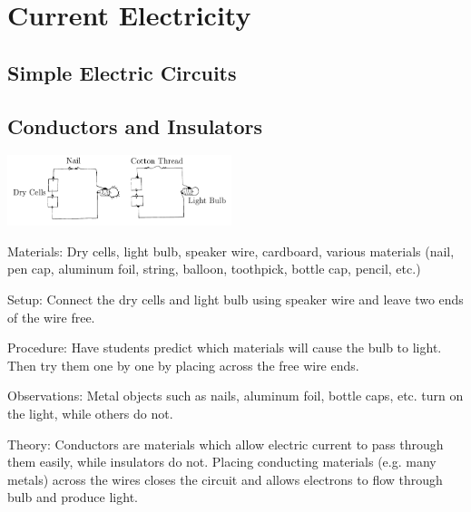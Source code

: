 \section{Current Electricity}
\label{sec:ii-current-electricity}

\begin{multicols}{2}


\section*{Simple Electric Circuits}


\subsection{Conductors and Insulators}

\begin{center}
\includegraphics[width=0.49\textwidth]{./img/conductors-insulators.png}
\end{center}

\begin{description*}
\item[Materials:]{Dry cells, light bulb, speaker wire, cardboard, various materials (nail, pen cap, aluminum foil, string, balloon, toothpick, bottle cap, pencil, etc.)}
\item[Setup:]{Connect the dry cells and light bulb using speaker wire and leave two ends of the wire free.}
\item[Procedure:]{Have students predict which materials will cause the bulb to light. Then try them one by one by placing across the free wire ends.}
\item[Observations:]{Metal objects such as nails, aluminum foil, bottle caps, etc. turn on the light, while others do not.}
\item[Theory:]{Conductors are materials which allow electric current to pass through them easily, while insulators do not. Placing conducting materials (e.g. many metals) across the wires closes the circuit and allows electrons to flow through bulb and produce light.}
\end{description*}


\end{multicols}
